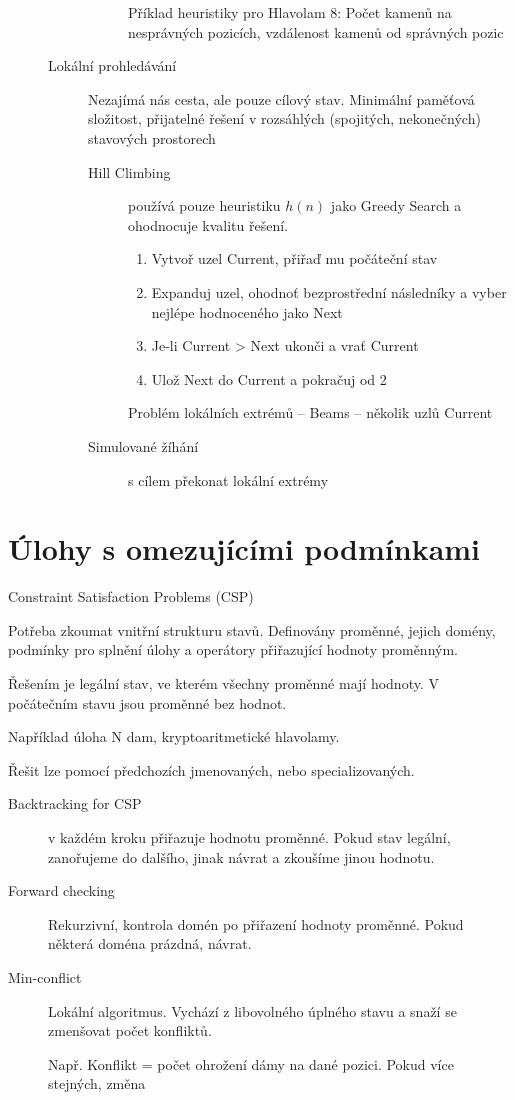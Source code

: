 \documentclass[a4wide]{report}
\begin{document}
\begin{description}
\begin{description}
\begin{description}
			Příklad heuristiky pro Hlavolam 8: Počet kamenů na nesprávných pozicích, vzdálenost kamenů od správných pozic
		\end{description}
		\item[Lokální prohledávání] Nezajímá nás cesta, ale pouze cílový stav. Minimální paměťová složitost, přijatelné řešení v rozsáhlých (spojitých, nekonečných) stavových prostorech
		\begin{description}
			\item[Hill Climbing] používá pouze heuristiku $h(n)$ jako Greedy Search a ohodnocuje kvalitu řešení.
			\begin{enumerate}
				\item Vytvoř uzel Current, přiřaď mu počáteční stav
				\item Expanduj uzel, ohodnoť bezprostřední následníky a vyber nejlépe hodnoceného jako Next
				\item Je-li Current > Next ukonči a vrať Current
				\item Ulož Next do Current a pokračuj od 2
			\end{enumerate}
			Problém lokálních extrémů -- Beams -- několik uzlů Current
			
			\item[Simulované žíhání] s cílem překonat lokální extrémy
		\end{description}
	\end{description}
\end{description}

\section{Úlohy s omezujícími podmínkami} Constraint Satisfaction Problems (CSP)

Potřeba zkoumat vnitřní strukturu stavů. Definovány proměnné, jejich domény, podmínky pro splnění úlohy a operátory přiřazující hodnoty proměnným.

Řešením je legální stav, ve kterém všechny proměnné mají hodnoty. V počátečním stavu jsou proměnné bez hodnot.

Například úloha N dam, kryptoaritmetické hlavolamy.

Řešit lze pomocí předchozích jmenovaných, nebo specializovaných.
\begin{description}
	\item[Backtracking for CSP] v každém kroku přiřazuje hodnotu proměnné. Pokud stav legální, zanořujeme do dalšího, jinak návrat a zkoušíme jinou hodnotu.
	
	\item[Forward checking] Rekurzivní, kontrola domén po přiřazení hodnoty proměnné. Pokud některá doména prázdná, návrat.
	
	\item[Min-conflict] Lokální algoritmus. Vychází z libovolného úplného stavu a snaží se zmenšovat počet konfliktů.
	
	Např. Konflikt = počet ohrožení dámy na dané pozici. Pokud více stejných, změna
\end{description}
\end{document}
